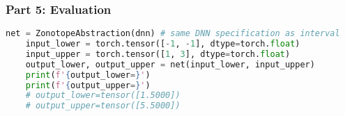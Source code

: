 \subsubsection{Part 5: Evaluation}


\begin{lstlisting}[language=Python]
    net = ZonotopeAbstraction(dnn) # same DNN specification as interval
    input_lower = torch.tensor([-1, -1], dtype=torch.float)
    input_upper = torch.tensor([1, 3], dtype=torch.float)
    output_lower, output_upper = net(input_lower, input_upper)
    print(f'{output_lower=}')
    print(f'{output_upper=}')
    # output_lower=tensor([1.5000])
    # output_upper=tensor([5.5000])
\end{lstlisting}
